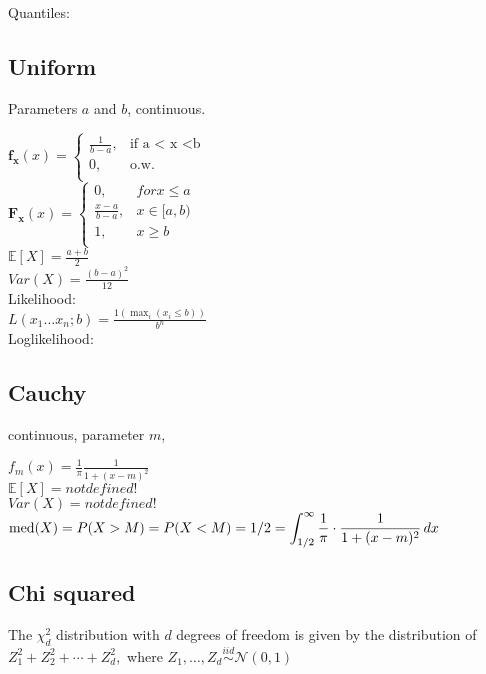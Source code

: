 Quantiles:\\

\subsection*{Uniform}

Parameters $a$ and $b$, continuous.

$ \mathbf{f_x}(x)=
	\begin{cases}
		 \frac{1}{b-a},&\text{if a < x <b}\\
		0,&\text{o.w.}\\
	\end{cases}
$\\

$ \mathbf{F_x}(x)=
	\begin{cases}
		 0,&for x \leq a\\
		 \frac{x-a}{b-a},& x \in [a,b)\\
		1,&x \geq b\\
	\end{cases}
$\\


$\mathbb{E}[X]=\frac{a+b}{2}$\\
$Var(X)=\frac{(b-a)^2}{12}$\\

Likelihood:\\
$L(x_1\dots x_n;b)=\frac{1(\max_i (x_i \leq b))} {b^n}$\\

Loglikelihood:\\

\subsection*{Cauchy}
continuous, parameter $m$,

$f_ m(x) = \frac{1}{\pi } \frac{1}{1 + (x - m)^2}$\\

$\mathbb{E}[X]=not defined!$\\
$Var(X)=not defined!$\\

$\text {med}(X) = P(X > M) = P(X < M)\\ = 1/2 = \displaystyle \int _{1/2}^{\infty } \frac{1}{\pi } \cdot \frac{1}{1 + (x-m)^2} \,  dx$

\subsection*{Chi squared}
The $\chi _ d^2$ distribution with $d$ degrees of freedom is given by the distribution of $Z_1^2 + Z_2^2 + \cdots + Z_ d^2,$ where $Z_1, \ldots , Z_ d \stackrel{iid}{\sim } \mathcal{N}(0,1)$

